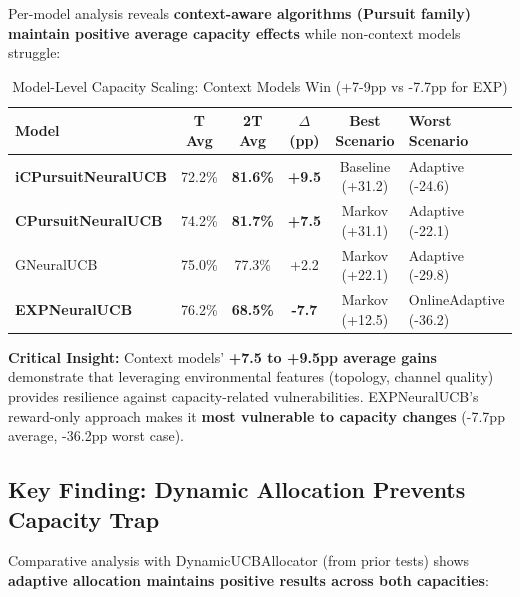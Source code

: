 \documentclass[11pt,a4paper]{article}
\newcommand{\critical}[1]{\textcolor{criticalcolor}{\textbf{#1}}}
\newcommand{\success}[1]{\textcolor{successcolor}{\textbf{#1}}}
\begin{document}
Per-model analysis reveals \textbf{context-aware algorithms (Pursuit family) maintain positive average capacity effects} while non-context models struggle:

\vspace{-0.4cm}

\begin{table}[H]
\scriptsize
\centering
\begin{tabular}{lccccl}
\toprule
\textbf{Model} & \textbf{T Avg} & \textbf{2T Avg} & \textbf{$\Delta$ (pp)} & \textbf{Best Scenario} & \textbf{Worst Scenario} \\
\midrule
\success{iCPursuitNeuralUCB} & 72.2\% & \success{81.6\%} & \success{+9.5} & Baseline (+31.2) & Adaptive (-24.6) \\
\success{CPursuitNeuralUCB} & 74.2\% & \success{81.7\%} & \success{+7.5} & Markov (+31.1) & Adaptive (-22.1) \\
GNeuralUCB & 75.0\% & 77.3\% & +2.2 & Markov (+22.1) & Adaptive (-29.8) \\
\critical{EXPNeuralUCB} & 76.2\% & \critical{68.5\%} & \critical{-7.7} & Markov (+12.5) & OnlineAdaptive (-36.2) \\
\bottomrule
\end{tabular}
\vspace{-0.2cm}
\caption{Model-Level Capacity Scaling: Context Models Win (+7-9pp vs -7.7pp for EXP)}
\end{table}

\vspace{-0.2cm}

\textbf{Critical Insight:} Context models' \textbf{+7.5 to +9.5pp average gains} demonstrate that leveraging environmental features (topology, channel quality) provides resilience against capacity-related vulnerabilities. EXPNeuralUCB's reward-only approach makes it \critical{most vulnerable to capacity changes} (-7.7pp average, -36.2pp worst case).

\subsection{Key Finding: Dynamic Allocation Prevents Capacity Trap}

Comparative analysis with DynamicUCBAllocator (from prior tests) shows \textbf{adaptive allocation maintains positive results across both capacities}:

\vspace{-0.4cm}
\end{document}
